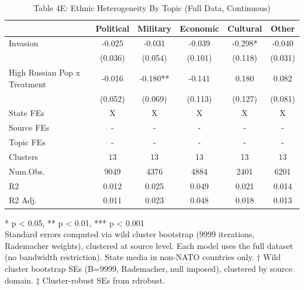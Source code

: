 \begin{table}[!t]
\caption{Table 4E: Ethnic Heterogeneity By Topic (Full Data, Continuous)} 
\fontsize{12.0pt}{14.4pt}\selectfont
\begin{tabular*}{\linewidth}{@{\extracolsep{\fill}}lccccc}
\toprule
  & Political & Military & Economic & Cultural & Other \\ 
\midrule\addlinespace[2.5pt]
Invasion & -0.025 & -0.031 & -0.039 & -0.298* & -0.040 \\ 
 & (0.036) & (0.054) & (0.101) & (0.118) & (0.031) \\ 
High Russian Pop x Treatment & -0.016 & -0.180** & -0.141 & 0.180 & 0.082 \\ 
{} & {(0.052)} & {(0.069)} & {(0.113)} & {(0.127)} & {(0.081)} \\ 
State FEs & X & X & X & X & X \\ 
Source FEs & - & - & - & - & - \\ 
Topic FEs & - & - & - & - & - \\ 
Clusters & 13 & 13 & 13 & 13 & 13 \\ 
Num.Obs. & 9049 & 4376 & 4884 & 2401 & 6201 \\ 
R2 & 0.012 & 0.025 & 0.049 & 0.021 & 0.014 \\ 
R2 Adj. & 0.011 & 0.023 & 0.048 & 0.018 & 0.013 \\ 
\bottomrule
\end{tabular*}
\begin{minipage}{\linewidth}
* p < 0.05, ** p < 0.01, *** p < 0.001\\
Standard errors computed via wild cluster bootstrap (9999 iterations, Rademacher
weights), clustered at source level. Each model uses the full dataset (no
bandwidth restriction). State media in non-NATO countries only. † Wild cluster
bootstrap SEs (B=9999, Rademacher, null imposed), clustered by source domain. ‡
Cluster-robust SEs from rdrobust.\\
\end{minipage}
\end{table}

